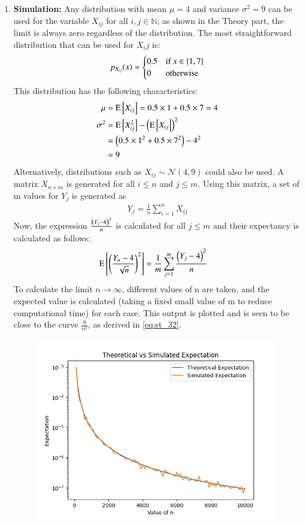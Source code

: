 \documentclass[journal,12pt,twocolumn]{IEEEtran}
\theoremstyle{remark}
\begin{document}
\begin{enumerate}
\item \textbf{Simulation:}
Any distribution with mean $\mu = 4$ and variance $\sigma^2 = 9$ can be used for the variable $X_{ij}$ for all $i,j \in \mathbb{N}$; as shown in the Theory part, the limit is always zero regardless of the distribution. The most straightforward distribution that can be used for $X_ij$ is:
\begin{align}
    p_{X_{ij}}(x) = \begin{cases}
    0.5 &\text{if }x \in \left\{1, 7\right\}\\
    0 &\text{otherwise }
    \end{cases}
\end{align}
This distribution has the following characteristics:
\begin{align}
    \mu &= \text{E}{}\left[X_{ij}\right] = 0.5\times1 + 0.5\times 7 = 4\\
    \sigma^2 &= \text{E}{}\left[X_{ij}^2\right] - \left(\text{E}{}\left[X_{ij}\right]\right)^2\\
    &= \left(0.5 \times 1^2 + 0.5 \times 7^2\right) - 4^2\\
    &= 9
\end{align}
Alternatively, distributions such as $X_{ij} \sim \mathcal{N}(4, 9)$ could also be used. A matrix $X_{n \times m}$ is generated for all $i \leq n$ and $j \leq m$.
Using this matrix, a set of m values for $Y_j$ is generated as
\begin{align}
    Y_j = \frac{1}{n} \sum_{i = 1}^{n} X_{ij}
\end{align}
Now, the expression $\frac{\left(Y_j - 4\right)^2}{n}$ is calculated for all $j \leq m$ and their expectancy is calculated as follows:
\begin{align}
    \text{E}{}\left[\left(\frac{Y_n - 4}{\sqrt{n}}\right)^2\right] &= \frac{1}{m}\sum_{j=1}^{m} \frac{\left(Y_j - 4\right)^2}{n}
\end{align}
To calculate the limit $n \rightarrow \infty$, different values of n are taken, and the expected value is calculated (taking a fixed small value of m to reduce computational time) for each case. This output is plotted and is seen to be close to the curve $\frac{9}{n^2}$, as derived in \eqref{eq:st_32}. 
\begin{figure}[h!]
    \includegraphics[width=\columnwidth]{figures/expectation.png}

\end{figure}
\end{enumerate}
\end{document}
